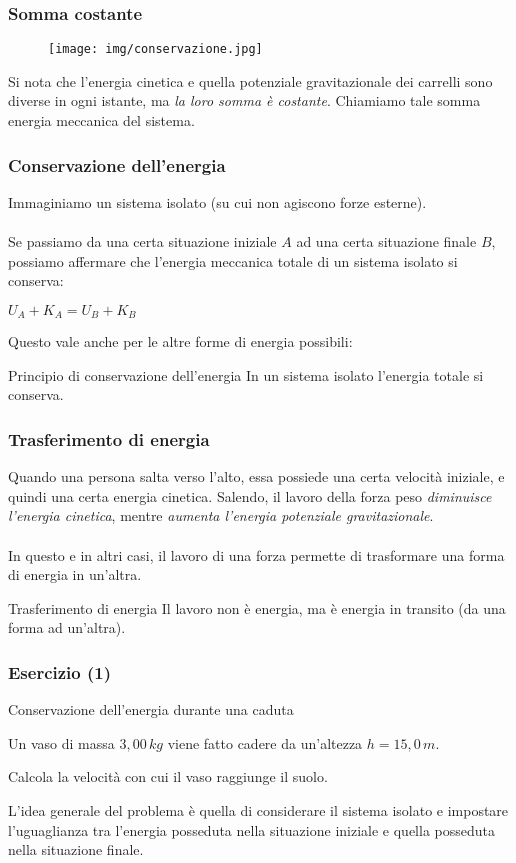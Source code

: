 \documentclass[]{beamer}
\theoremstyle{plain}
\begin{document}
\begin{frame}
  \frametitle{Somma costante}
  \begin{figure}
  \texttt{[image: img/conservazione.jpg]}
\end{figure}\pause
Si nota che l'energia cinetica e quella potenziale gravitazionale dei carrelli sono diverse in ogni istante, ma \emph{la loro somma è costante}. Chiamiamo tale somma \alert{energia meccanica del sistema}.
\end{frame}


\begin{frame}
  \frametitle{Conservazione dell'energia}
  Immaginiamo un sistema isolato (su cui non agiscono forze esterne).\\~\pause\\  
  Se passiamo da una certa situazione iniziale $ A $ ad una certa situazione finale $ B $, possiamo affermare che \alert<2>{l'energia meccanica totale di un sistema isolato si conserva}:
\begin{center}
\colorbox{marroncino!30}{$ U_A + K_A = U_B + K_B $}
\end{center}\pause
Questo vale anche per le altre forme di energia possibili:
\begin{block}{Principio di conservazione dell'energia}
  In un sistema isolato l'energia totale si conserva.
\end{block}
\end{frame}


\begin{frame}
\frametitle{Trasferimento di energia}
  Quando una persona salta verso l'alto, essa possiede una certa velocità iniziale, e quindi una certa energia cinetica. Salendo, il lavoro della forza peso \emph<1>{diminuisce l'energia cinetica}, mentre \emph<1>{aumenta l'energia potenziale gravitazionale}.\\~\pause\\In questo e in altri casi, \alert<2>{il lavoro di una forza permette di trasformare una forma di energia in un'altra}.\pause
\begin{block}{Trasferimento di energia}
Il lavoro non è energia, ma è energia in transito (da una forma ad un'altra).
\end{block}
\end{frame}



\begin{frame}
  \frametitle{Esercizio (1)}
  \begin{exampleblock}{Conservazione dell'energia durante una caduta}
{\small Un vaso di massa $ 3,00 \, kg $ viene fatto cadere da un'altezza $ h = 15,0 \, m $.

Calcola la velocità con cui il vaso raggiunge il suolo.}
\end{exampleblock}
  \pause
  L'idea generale del problema è quella di considerare il sistema isolato e impostare l'uguaglianza tra l'energia posseduta nella situazione iniziale e quella posseduta nella situazione finale.
\end{frame}
\end{document}
